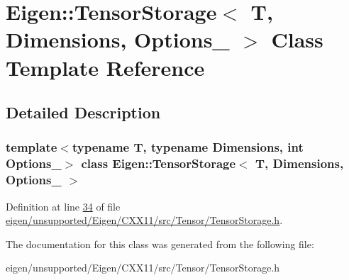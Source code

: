 \hypertarget{class_eigen_1_1_tensor_storage}{}\section{Eigen\+:\+:Tensor\+Storage$<$ T, Dimensions, Options\+\_\+ $>$ Class Template Reference}
\label{class_eigen_1_1_tensor_storage}


\subsection{Detailed Description}
\subsubsection*{template$<$typename T, typename Dimensions, int Options\+\_\+$>$\newline
class Eigen\+::\+Tensor\+Storage$<$ T, Dimensions, Options\+\_\+ $>$}



Definition at line \hyperlink{eigen_2unsupported_2_eigen_2_c_x_x11_2src_2_tensor_2_tensor_storage_8h_source_l00034}{34} of file \hyperlink{eigen_2unsupported_2_eigen_2_c_x_x11_2src_2_tensor_2_tensor_storage_8h_source}{eigen/unsupported/\+Eigen/\+C\+X\+X11/src/\+Tensor/\+Tensor\+Storage.\+h}.



The documentation for this class was generated from the following file\+:\begin{DoxyCompactItemize}
\item 
eigen/unsupported/\+Eigen/\+C\+X\+X11/src/\+Tensor/\+Tensor\+Storage.\+h\end{DoxyCompactItemize}
